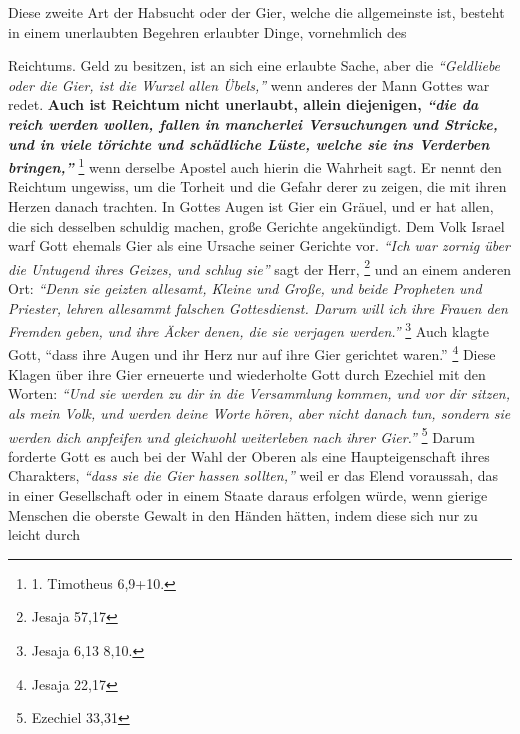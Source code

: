 Diese zweite Art der Habsucht oder der Gier, welche die allgemeinste ist,
besteht in einem unerlaubten Begehren erlaubter Dinge, vornehmlich des

 Reichtums. Geld zu besitzen, ist an sich eine erlaubte Sache, aber die
\textit{"`Geldliebe oder die Gier, ist die Wurzel allen Übels,"'} wenn anderes
der Mann
Gottes war redet. \label{ref:13_05_reichtum} \textbf{Auch ist
Reichtum nicht unerlaubt, allein diejenigen,
\textit{"`die da reich werden wollen, fallen in mancherlei Versuchungen und
Stricke, und in
viele törichte und schädliche Lüste, welche sie ins Verderben
bringen,"'}}
\footnote{1. Timotheus 6,9+10.}
wenn derselbe Apostel auch hierin die
Wahrheit sagt. Er nennt den Reichtum ungewiss, um die Torheit und die Gefahr
derer zu zeigen, die mit ihren Herzen danach trachten. In Gottes Augen ist
Gier ein Gräuel, und er hat allen, die sich desselben schuldig machen, große
Gerichte angekündigt. Dem Volk
Israel warf Gott ehemals Gier als eine
Ursache seiner Gerichte vor.
\textit{"`Ich war zornig über die Untugend ihres Geizes,
und schlug sie"'} sagt der Herr,
\footnote{Jesaja 57,17}
und an einem anderen Ort: 
\textit{"`Denn sie geizten
 allesamt, Kleine und Große, und beide Propheten und
Priester, lehren allesammt falschen Gottesdienst. Darum will ich ihre Frauen den
Fremden geben, und ihre Äcker denen, die sie verjagen werden."'}
\footnote{Jesaja 6,13 8,10.}
Auch klagte Gott,
"`dass ihre Augen und ihr Herz nur auf ihre Gier
gerichtet waren."'
\footnote{Jesaja 22,17}
Diese Klagen über ihre Gier erneuerte
und wiederholte Gott durch Ezechiel mit den Worten:
\textit{"`Und sie werden zu dir
in die Versammlung kommen, und vor dir sitzen, als mein Volk, und werden deine
Worte hören, aber nicht danach tun, sondern sie werden dich anpfeifen und
gleichwohl weiterleben nach ihrer Gier."'}
\footnote{Ezechiel 33,31}
Darum forderte
Gott es auch bei der Wahl der Oberen als eine Haupteigenschaft ihres Charakters,
\textit{"`dass sie die Gier hassen sollten,"'} weil er das Elend voraussah, das
in einer
Gesellschaft oder in einem Staate daraus erfolgen würde, wenn
gierige Menschen
die oberste Gewalt in den Händen hätten, indem diese sich nur zu leicht durch
